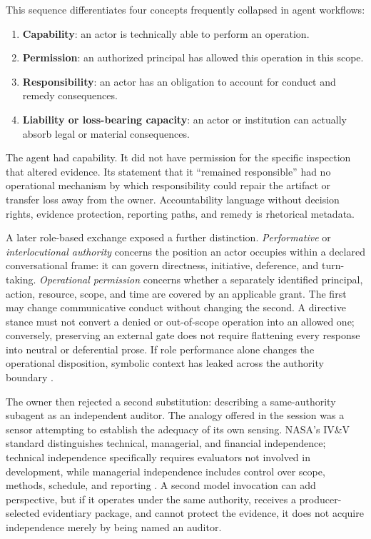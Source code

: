 \documentclass[10pt,a4paper]{article}
\begin{document}
This sequence differentiates four concepts frequently collapsed in agent workflows:

\begin{enumerate}
  \item \textbf{Capability}: an actor is technically able to perform an operation.
  \item \textbf{Permission}: an authorized principal has allowed this operation in this scope.
  \item \textbf{Responsibility}: an actor has an obligation to account for conduct and remedy consequences.
  \item \textbf{Liability or loss-bearing capacity}: an actor or institution can actually absorb legal or material consequences.
\end{enumerate}

The agent had capability. It did not have permission for the specific inspection that altered evidence. Its statement that it ``remained responsible'' had no operational mechanism by which responsibility could repair the artifact or transfer loss away from the owner. Accountability language without decision rights, evidence protection, reporting paths, and remedy is rhetorical metadata.

A later role-based exchange exposed a further distinction. \emph{Performative} or \emph{interlocutional authority} concerns the position an actor occupies within a declared conversational frame: it can govern directness, initiative, deference, and turn-taking. \emph{Operational permission} concerns whether a separately identified principal, action, resource, scope, and time are covered by an applicable grant. The first may change communicative conduct without changing the second. A directive stance must not convert a denied or out-of-scope operation into an allowed one; conversely, preserving an external gate does not require flattening every response into neutral or deferential prose. If role performance alone changes the operational disposition, symbolic context has leaked across the authority boundary \cite{sessionrecord}.

The owner then rejected a second substitution: describing a same-authority subagent as an independent auditor. The analogy offered in the session was a sensor attempting to establish the adequacy of its own sensing. NASA's IV\&V standard distinguishes technical, managerial, and financial independence; technical independence specifically requires evaluators not involved in development, while managerial independence includes control over scope, methods, schedule, and reporting \cite{nasa8739}. A second model invocation can add perspective, but if it operates under the same authority, receives a producer-selected evidentiary package, and cannot protect the evidence, it does not acquire independence merely by being named an auditor.
\end{document}
